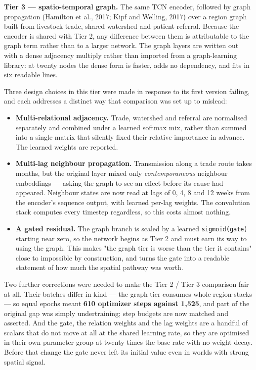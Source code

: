 \documentclass[11pt,a4paper]{article}
\begin{document}
\textbf{Tier 3 — spatio-temporal graph.} The same TCN encoder, followed by graph propagation (Hamilton et al., 2017; Kipf and Welling, 2017) over a region graph built from livestock trade, shared watershed and patient referral. Because the encoder is shared with Tier 2, any difference between them is attributable to the graph term rather than to a larger network. The graph layers are written out with a dense adjacency multiply rather than imported from a graph-learning library: at twenty nodes the dense form is faster, adds no dependency, and fits in six readable lines.

Three design choices in this tier were made in response to its first version failing, and each addresses a distinct way that comparison was set up to mislead:

\begin{itemize}[leftmargin=1.3em,itemsep=2pt]
  \item \textbf{Multi-relational adjacency.} Trade, watershed and referral are normalised separately and combined under a learned softmax mix, rather than summed into a single matrix that silently fixed their relative importance in advance. The learned weights are reported.
  \item \textbf{Multi-lag neighbour propagation.} Transmission along a trade route takes months, but the original layer mixed only \emph{contemporaneous} neighbour embeddings — asking the graph to see an effect before its cause had appeared. Neighbour states are now read at lags of 0, 4, 8 and 12 weeks from the encoder's sequence output, with learned per-lag weights. The convolution stack computes every timestep regardless, so this costs almost nothing.
  \item \textbf{A gated residual.} The graph branch is scaled by a learned \texttt{sigmoid(gate)} starting near zero, so the network begins as Tier 2 and must earn its way to using the graph. This makes "the graph tier is worse than the tier it contains" close to impossible by construction, and turns the gate into a readable statement of how much the spatial pathway was worth.
\end{itemize}

Two further corrections were needed to make the Tier 2 / Tier 3 comparison fair at all. Their batches differ in kind — the graph tier consumes whole region-stacks — so equal epochs meant \textbf{610 optimizer steps against 1,525}, and part of the original gap was simply undertraining; step budgets are now matched and asserted. And the gate, the relation weights and the lag weights are a handful of scalars that do not move at all at the shared learning rate, so they are optimised in their own parameter group at twenty times the base rate with no weight decay. Before that change the gate never left its initial value even in worlds with strong spatial signal.
\end{document}
